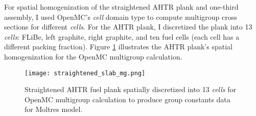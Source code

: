 For spatial homogenization of the straightened \gls{AHTR} plank and 
one-third assembly, I used OpenMC's \textit{cell} domain type to compute 
multigroup cross sections for different \textit{cells}. 
For the \gls{AHTR} plank, I discretized the plank into 13 \textit{cells}:
FLiBe, left graphite, right graphite, and ten fuel cells (each cell has a different 
packing fraction).
Figure \ref{fig:straightened_slab_mg} illustrates the \gls{AHTR} plank's spatial 
homogenization for the OpenMC multigroup calculation. 
\begin{figure}[htbp]
    \centering
    \texttt{[image: straightened\_slab\_mg.png]}
    \raggedright
    \caption{Straightened \acrfull{AHTR} fuel plank spatially discretized into 
    13 \textit{cells} for OpenMC multigroup calculation to produce group constants 
    data for Moltres model.}
    \label{fig:straightened_slab_mg}
\end{figure}

